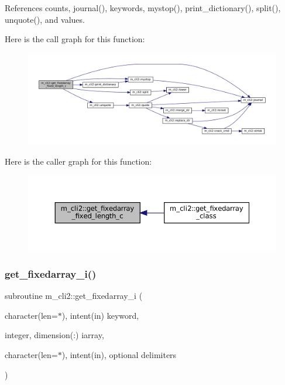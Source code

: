 References counts, journal(), keywords, mystop(), print\+\_\+dictionary(), split(), unquote(), and values.

Here is the call graph for this function\+:
\nopagebreak
\begin{figure}[H]
\begin{center}
\leavevmode
\includegraphics[width=350pt]{namespacem__cli2_a8000c5e05f6c84ba17350d4a00850a6a_cgraph}
\end{center}
\end{figure}
Here is the caller graph for this function\+:
\nopagebreak
\begin{figure}[H]
\begin{center}
\leavevmode
\includegraphics[width=350pt]{namespacem__cli2_a8000c5e05f6c84ba17350d4a00850a6a_icgraph}
\end{center}
\end{figure}
\mbox{\label{namespacem__cli2_aa469ba94e6bb122c9bf30dd8642b693b}} 
\subsubsection{\texorpdfstring{get\+\_\+fixedarray\+\_\+i()}{get\_fixedarray\_i()}}
{\footnotesize\ttfamily subroutine m\+\_\+cli2\+::get\+\_\+fixedarray\+\_\+i (\begin{DoxyParamCaption}\item[{character(len=$\ast$), intent(in)}]{keyword,  }\item[{integer, dimension(\+:)}]{iarray,  }\item[{character(len=$\ast$), intent(in), optional}]{delimiters }\end{DoxyParamCaption})\hspace{0.3cm}{\ttfamily [private]}}



